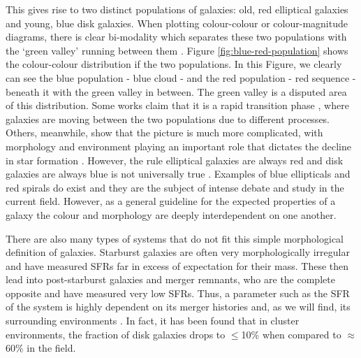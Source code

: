 This gives rise to two distinct populations of galaxies: old, red elliptical galaxies and young, blue disk galaxies. When plotting colour-colour or colour-magnitude diagrams, there is clear bi-modality which separates these two populations with the `green valley' running between them \citep{2001AJ....122.1861S}. Figure \ref{fig:blue-red-population} shows the colour-colour distribution if the two populations. In this Figure, we clearly can see the blue population - blue cloud - and the red population - red sequence - beneath it with the green valley in between. The green valley is a disputed area of this distribution. Some works claim that it is a rapid transition phase \citep{2007ApJS..173..315S, 2015MNRAS.450..435S}, where galaxies are moving between the two populations due to different processes. Others, meanwhile, show that the picture is much more complicated, with morphology and environment playing an important role that dictates the decline in star formation \citep{2014MNRAS.440..889S}. However, the rule elliptical galaxies are always red and disk galaxies are always blue is not universally true \citep{2022MNRAS.510.4126S}. Examples of blue ellipticals and red spirals do exist \citep{2009MNRAS.396..818S, 2010MNRAS.405..783M, 2022AJ....163..150K} and they are the subject of intense debate and study in the current field. However, as a general guideline for the expected properties of a galaxy the colour and morphology are deeply interdependent on one another.

There are also many types of systems that do not fit this simple morphological definition of galaxies. Starburst galaxies are often very morphologically irregular and have measured SFRs far in excess of expectation for their mass. These then lead into post-starburst galaxies and merger remnants, who are the complete opposite and have measured very low SFRs. Thus, a parameter such as the SFR of the system is highly dependent on its merger histories and, as we will find, its surrounding environments \citep{2018MNRAS.477.1708P, 2020MNRAS.493.3716H}. In fact, it has been found that in cluster environments, the fraction of disk galaxies drops to $\leq$10\% when compared to $\approx$60\% in the field.


